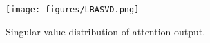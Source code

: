 \begin{figure}[htbp]
\centering
\texttt{[image: figures/LRASVD.png]}
\caption{
Singular value distribution of attention output. }
\label{fig:svd}
\end{figure}
